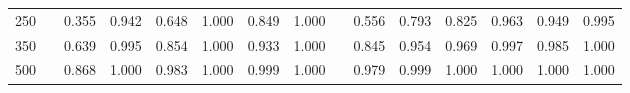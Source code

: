 % 
\begin{tabular}{ccccccccccccccc}
  \hline
  \hline
250 &  & 0.355 & 0.942 & 0.648 & 1.000 & 0.849 & 1.000 &  & 0.556 & 0.793 & 0.825 & 0.963 & 0.949 & 0.995 \\ 
  350 &  & 0.639 & 0.995 & 0.854 & 1.000 & 0.933 & 1.000 &  & 0.845 & 0.954 & 0.969 & 0.997 & 0.985 & 1.000 \\ 
  500 &  & 0.868 & 1.000 & 0.983 & 1.000 & 0.999 & 1.000 &  & 0.979 & 0.999 & 1.000 & 1.000 & 1.000 & 1.000 \\ 
   \hline
\end{tabular}
